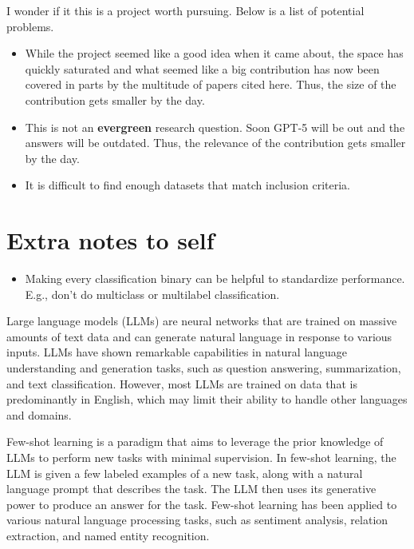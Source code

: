 \documentclass[
  10pt,
  letterpaper,
  DIV=11,
  numbers=noendperiod]{scrartcl}
\providecommand{\tightlist}{%
  \setlength{\itemsep}{0pt}\setlength{\parskip}{0pt}}\usepackage{longtable,booktabs,array}
\begin{document}
I wonder if it this is a project worth pursuing. Below is a list of
potential problems.

\begin{itemize}
\tightlist
\item
  While the project seemed like a good idea when it came about, the
  space has quickly saturated and what seemed like a big contribution
  has now been covered in parts by the multitude of papers cited here.
  Thus, the size of the contribution gets smaller by the day.
\item
  This is not an \textbf{evergreen} research question. Soon GPT-5 will
  be out and the answers will be outdated. Thus, the relevance of the
  contribution gets smaller by the day.
\item
  It is difficult to find enough datasets that match inclusion criteria.
\end{itemize}

\hypertarget{extra-notes-to-self}{%
\section{Extra notes to self}\label{extra-notes-to-self}}

\begin{itemize}
\tightlist
\item
  Making every classification binary can be helpful to standardize
  performance. E.g., don't do multiclass or multilabel classification.
\end{itemize}

Large language models (LLMs) are neural networks that are trained on
massive amounts of text data and can generate natural language in
response to various inputs. LLMs have shown remarkable capabilities in
natural language understanding and generation tasks, such as question
answering, summarization, and text classification. However, most LLMs
are trained on data that is predominantly in English, which may limit
their ability to handle other languages and domains.

Few-shot learning is a paradigm that aims to leverage the prior
knowledge of LLMs to perform new tasks with minimal supervision. In
few-shot learning, the LLM is given a few labeled examples of a new
task, along with a natural language prompt that describes the task. The
LLM then uses its generative power to produce an answer for the task.
Few-shot learning has been applied to various natural language
processing tasks, such as sentiment analysis, relation extraction, and
named entity recognition.
\end{document}
